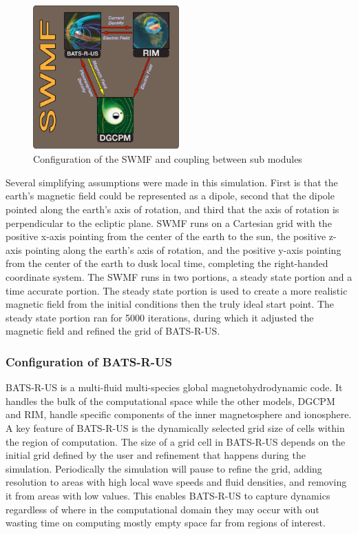 \documentclass[utf8]{frontiersinFPHY_FAMS}
\begin{document}
\begin{figure}[!ht]
\begin{center}
\includegraphics[width=0.5\textwidth]{SWMF_config.png}
\caption{Configuration of the SWMF and coupling between sub modules}
\label{fig:Configuration}
\end{center}
\end{figure}


Several simplifying assumptions were made in this simulation. First is that the earth's magnetic field could be represented as a dipole, second that the dipole pointed along the earth's axis of rotation, and third that the axis of rotation is perpendicular to the ecliptic plane. SWMF runs on a Cartesian grid with the positive x-axis pointing from the center of the earth to the sun, the positive z-axis pointing along the earth's axis of rotation, and the positive y-axis pointing from the center of the earth to dusk local time, completing the right-handed coordinate system. The SWMF runs in two portions, a steady state portion and a time accurate portion. The steady state portion is used to create a more realistic magnetic field from the initial conditions then the truly ideal start point. The steady state portion ran for 5000 iterations, during which it adjusted the magnetic field and refined the grid of BATS-R-US.

\subsubsection{Configuration of BATS-R-US}

BATS-R-US is a multi-fluid multi-species global magnetohydrodynamic code. It handles the bulk of the computational space while the other models, DGCPM and RIM, handle specific components of the inner magnetosphere and ionosphere. A key feature of BATS-R-US is the dynamically selected grid size of cells within the region of computation. The size of a grid cell in BATS-R-US depends on the initial grid defined by the user and refinement that happens during the simulation. Periodically the simulation will pause to refine the grid, adding resolution to areas with high local wave speeds and fluid densities, and removing it from areas with low values. This enables BATS-R-US to capture dynamics regardless of where in the computational domain they may occur with out wasting time on computing mostly empty space far from regions of interest.
\end{document}
